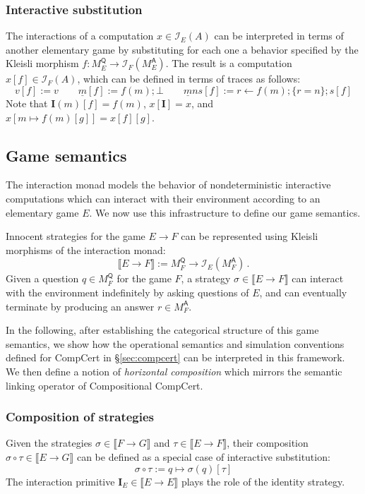 \documentclass[format=sigplan,authordraft]{acmart}
\newcommand{\kw}[1]{\ensuremath{ \mathsf{#1} }}
\begin{document}
\subsubsection{Interactive substitution}

The interactions of a computation $x \in \mathcal{I}_E(A)$
can be interpreted in terms of another elementary game
by substituting for each one a behavior specified by
the Kleisli morphism
$f : M_E^\kw{Q} \rightarrow \mathcal{I}_F(M_E^\kw{A})$.
The result is a computation $x[f] \in \mathcal{I}_F(A)$,
which can be defined in terms of traces as follows:
\[
  v[f] := v \qquad
  \underline{m}[f] := f(m) ; \bot \qquad
  \underline{m}ns[f] := r \leftarrow f(m) ; \{r = n\} ; s[f]
\]
Note that $\mathbf{I}(m)[f] = f(m)$,
$x[\mathbf{I}] = x$,
and $x[m \mapsto f(m)[g]] = x[f][g]$.


\subsection{Game semantics}

The interaction monad
models the behavior of
nondeterministic interactive computations
which can interact with their environment
according to an elementary game $E$.
We now use this infrastructure
to define our game semantics.

Innocent strategies for the game $E \rightarrow F$
can be represented using Kleisli morphisms of
the interaction monad:
\[
  \llbracket E \rightarrow F \rrbracket :=
  M_F^\kw{Q} \rightarrow \mathcal{I}_E(M_F^\kw{A}) \,.
\]
Given a question $q \in M_F^\kw{Q}$ for the game $F$,
a strategy $\sigma \in \llbracket E \rightarrow F \rrbracket$
can interact with the environment
indefinitely by asking questions of $E$,
and can eventually terminate by producing an answer $r \in M_F^\kw{A}$.

In the following,
after establishing the categorical structure
of this game semantics,
we show how
the operational semantics
and simulation conventions
defined for CompCert in \S\ref{sec:compcert}
can be interpreted in this framework.
We then define a notion of \emph{horizontal composition}
which mirrors the semantic linking operator
of Compositional CompCert.

\subsubsection{Composition of strategies}

Given the strategies
$\sigma \in \llbracket F \rightarrow G \rrbracket$ and
$\tau \in \llbracket E \rightarrow F \rrbracket$,
their composition
$\sigma \circ \tau \in \llbracket E \rightarrow G \rrbracket$
can be defined as a special case of interactive substitution:
\[
    \sigma \circ \tau := q \mapsto \sigma(q)[\tau]
\]
The interaction primitive
$\mathbf{I}_E \in \llbracket E \rightarrow E \rrbracket$
plays the role of the identity strategy.
\end{document}

